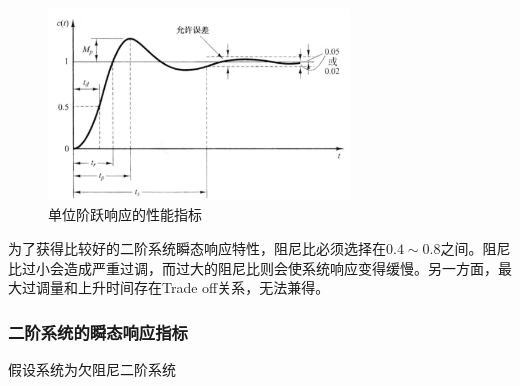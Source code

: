 \begin{figure}[!ht]
	\centering
	\includegraphics[width=8cm]{figures/11.png}
	\caption{单位阶跃响应的性能指标}
	\label{11}
\end{figure}

为了获得比较好的二阶系统瞬态响应特性，阻尼比必须选择在$0.4\sim0.8$之间。阻尼比过小会造成严重过调，而过大的阻尼比则会使系统响应变得缓慢。另一方面，最大过调量和上升时间存在Trade off关系，无法兼得。

\subsubsection{二阶系统的瞬态响应指标}

假设系统为欠阻尼二阶系统

